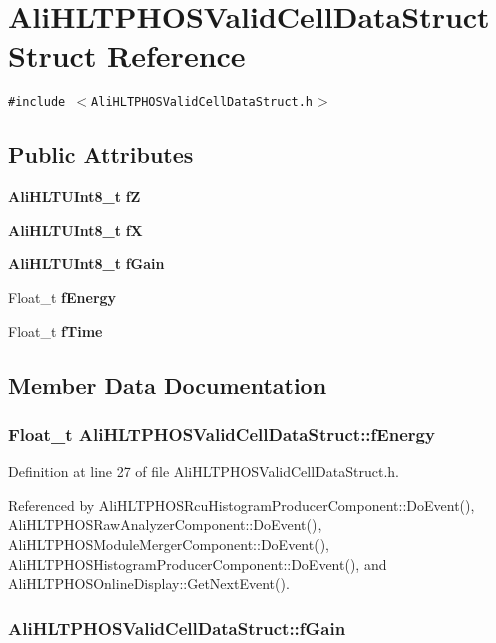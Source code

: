 \section{Ali\-HLTPHOSValid\-Cell\-Data\-Struct Struct Reference}
\label{structAliHLTPHOSValidCellDataStruct}
{\tt \#include $<$Ali\-HLTPHOSValid\-Cell\-Data\-Struct.h$>$}

\subsection*{Public Attributes}
\begin{CompactItemize}
\item 
{\bf Ali\-HLTUInt8\_\-t} {\bf f\-Z}
\item 
{\bf Ali\-HLTUInt8\_\-t} {\bf f\-X}
\item 
{\bf Ali\-HLTUInt8\_\-t} {\bf f\-Gain}
\item 
Float\_\-t {\bf f\-Energy}
\item 
Float\_\-t {\bf f\-Time}
\end{CompactItemize}


\subsection{Member Data Documentation}
\subsubsection{\setlength{\rightskip}{0pt plus 5cm}Float\_\-t {\bf Ali\-HLTPHOSValid\-Cell\-Data\-Struct::f\-Energy}}\label{structAliHLTPHOSValidCellDataStruct_o3}




Definition at line 27 of file Ali\-HLTPHOSValid\-Cell\-Data\-Struct.h.

Referenced by Ali\-HLTPHOSRcu\-Histogram\-Producer\-Component::Do\-Event(), Ali\-HLTPHOSRaw\-Analyzer\-Component::Do\-Event(), Ali\-HLTPHOSModule\-Merger\-Component::Do\-Event(), Ali\-HLTPHOSHistogram\-Producer\-Component::Do\-Event(), and Ali\-HLTPHOSOnline\-Display::Get\-Next\-Event().
\subsubsection{ {\bf Ali\-HLTPHOSValid\-Cell\-Data\-Struct::f\-Gain}}\label{structAliHLTPHOSValidCellDataStruct_o2}




